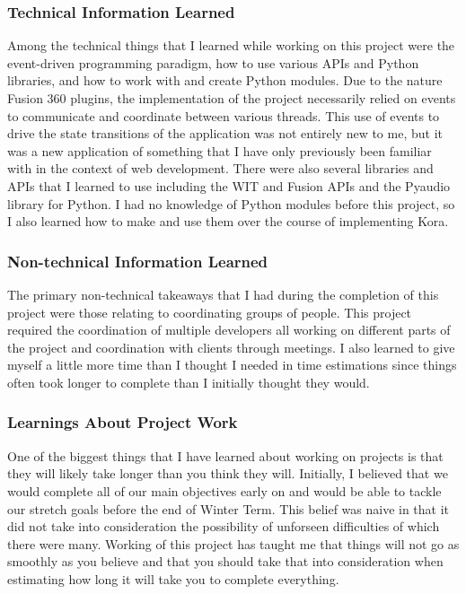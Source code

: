 \documentclass[onecolumn, draftclsnofoot,10pt, compsoc]{IEEEtran}
\begin{document}
	\subsubsection{Technical Information Learned}
		Among the technical things that I learned while working on this project were the event-driven programming paradigm, how to use various APIs and Python libraries, and how to work with and create Python modules.
		Due to the nature Fusion 360 plugins, the implementation of the project necessarily relied on events to communicate and coordinate between various threads.
		This use of events to drive the state transitions of the application was not entirely new to me, but it was a new application of something that I have only previously been familiar with in the context of web development.
		There were also several libraries and APIs that I learned to use including the WIT and Fusion APIs and the Pyaudio library for Python.
		I had no knowledge of Python modules before this project, so I also learned how to make and use them over the course of implementing Kora.

	\subsubsection{Non-technical Information Learned}
		The primary non-technical takeaways that I had during the completion of this project were those relating to coordinating groups of people.
		This project required the coordination of multiple developers all working on different parts of the project and coordination with clients through meetings.
		I also learned to give myself a little more time than I thought I needed in time estimations since things often took longer to complete than I initially thought they would.

	\subsubsection{Learnings About Project Work}
		One of the biggest things that I have learned about working on projects is that they will likely take longer than you think they will.
		Initially, I believed that we would complete all of our main objectives early on and would be able to tackle our stretch goals before the end of Winter Term.
		This belief was naive in that it did not take into consideration the possibility of unforseen difficulties of which there were many.
		Working of this project has taught me that things will not go as smoothly as you believe and that you should take that into consideration when estimating how long it will take you to complete everything.
\end{document}
